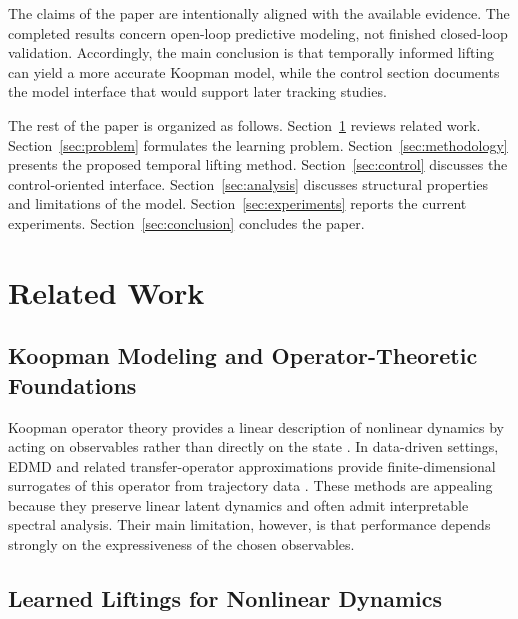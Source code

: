 \documentclass[journal]{IEEEtran}
\begin{document}
The claims of the paper are intentionally aligned with the available evidence. The completed results concern open-loop predictive modeling, not finished closed-loop validation. Accordingly, the main conclusion is that temporally informed lifting can yield a more accurate Koopman model, while the control section documents the model interface that would support later tracking studies.

The rest of the paper is organized as follows. Section~\ref{sec:related_work} reviews related work. Section~\ref{sec:problem} formulates the learning problem. Section~\ref{sec:methodology} presents the proposed temporal lifting method. Section~\ref{sec:control} discusses the control-oriented interface. Section~\ref{sec:analysis} discusses structural properties and limitations of the model. Section~\ref{sec:experiments} reports the current experiments. Section~\ref{sec:conclusion} concludes the paper.

\section{Related Work}
\label{sec:related_work}

\subsection{Koopman Modeling and Operator-Theoretic Foundations}

Koopman operator theory provides a linear description of nonlinear dynamics by acting on observables rather than directly on the state \cite{koopman1931hamiltonian, koopman1932spectra, mezic2005spectral, rowley2009spectral}. In data-driven settings, EDMD and related transfer-operator approximations provide finite-dimensional surrogates of this operator from trajectory data \cite{williams2015data, williams2015kernel, klus2018data}. These methods are appealing because they preserve linear latent dynamics and often admit interpretable spectral analysis. Their main limitation, however, is that performance depends strongly on the expressiveness of the chosen observables.

\subsection{Learned Liftings for Nonlinear Dynamics}
\end{document}
